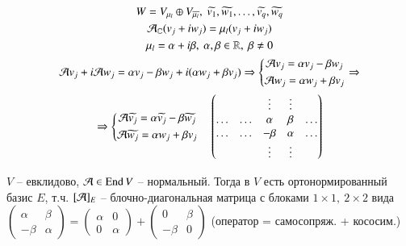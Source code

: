 \documentclass[main]{subfiles}
\begin{document}
\begin{gather*}
    W = V_{\mu_l} \oplus V_{\overline{\mu_l}}, \ \widetilde{v_1}, \widetilde{w_1}, \ldots, \widetilde{v_q}, \widetilde{w_q} \\
    \mathcal{A}_{\mathbb{C}}(v_j+ iw_j) = \mu_l (v_j+ iw_j) \\
    \mu_l = \alpha + i \beta, \ \alpha, \beta \in \mathbb{R}, \ \beta \neq 0 \\
    \mathcal{A} v_j + i \mathcal{A} w_j =\alpha v_j - \beta w_j + i(\alpha w_j + \beta v_j) \Rightarrow \left\{ \begin{gathered}
        \mathcal{A} v_j=\alpha v_j - \beta w_j \\
        \mathcal{A} w_j=\alpha w_j + \beta v_j
     \end{gathered} \right.
    \Rightarrow  \\ \Rightarrow \left\{ \begin{gathered}
       \mathcal{A} \widetilde{v_j}=\alpha \widetilde{v_j} - \beta \widetilde{w_j} \\
        \mathcal{A} \widetilde{w_j}=\alpha w_j + \beta v_j
    \end{gathered} \right. \quad
    \begin{pmatrix}
        & & \vdots & \vdots &  \\
        \ldots & \ldots & \alpha & \beta & \ldots \\
        \ldots & \ldots & -\beta & \alpha & \ldots \\
        & & \vdots & \vdots &  \\
    \end{pmatrix}
\end{gather*}

\begin{theorem} 
    $V$ -- евклидово, $\mathcal{A} \in \operatorname{End} V$ -- нормальный. Тогда в $V$ есть ортонормированный базис $E$, т.ч. $[\mathcal{A}]_E$ -- блочно-диагональная матрица с блоками $1\times 1, \ 2\times 2$ вида 
    $\begin{pmatrix}
        \alpha & \beta \\
        -\beta & \alpha
    \end{pmatrix} = \begin{pmatrix}
        \alpha & 0 \\
        0 & \alpha
    \end{pmatrix} + \begin{pmatrix}
        0 & \beta \\
        -\beta & 0
    \end{pmatrix}$ (оператор = самосопряж. + кососим.)
\end{theorem}
\end{document}
